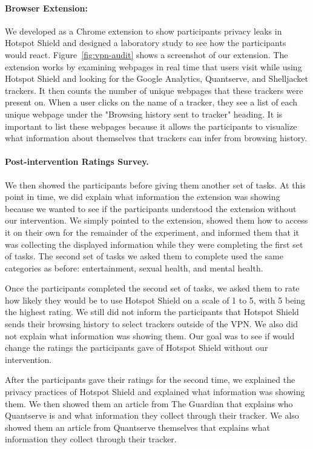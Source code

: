 \paragraph{Browser Extension: \tool}
We developed \tool as a Chrome extension to show participants privacy leaks
in Hotspot Shield and designed a laboratory study to see how the participants
would react.  Figure~\ref{fig:vpn-audit} shows a screenshot of our extension.
The extension works by examining webpages in real time that users visit while
using Hotspot Shield and looking for the Google Analytics, Quantserve, and
Shelljacket trackers.  It then counts the number of unique webpages that these
trackers were present on.  When a user clicks on the name of a tracker, they
see a list of each unique webpage under the "Browsing history sent to tracker"
heading. It is important to list these webpages because it allows the participants to visualize what information about themselves that trackers can infer from browsing history.


\paragraph{Post-intervention Ratings Survey.}
We then showed the participants \tool before giving them another set of tasks.
At this point in time, we did explain what information the extension was showing because we wanted to see if the participants understood the extension without our intervention.
We simply pointed to the extension, showed them how to access it on their own for the remainder of the experiment, and informed them that it was collecting the displayed information while they were completing the first set of tasks.
The second set of tasks we asked them to complete used the same categories as before: entertainment, sexual health, and mental health.

Once the participants completed the second set of tasks, we asked them to rate how likely they would be to use Hotspot Shield on a scale of 1 to 5, with 5 being the highest rating.
We still did not inform the participants that Hotspot Shield sends their browsing history to select trackers outside of the VPN.
We also did not explain what information \tool was showing them.
Our goal was to see if \tool would change the ratings the participants gave of Hotspot Shield without our intervention.

After the participants gave their ratings for the second time, we explained the privacy practices of Hotspot Shield and explained what information \tool was showing them.
We then showed them an article from The Guardian that explains who Quantserve is and what information they collect through their tracker.
We also showed them an article from Quantserve themselves that explains what information they collect through their tracker.

